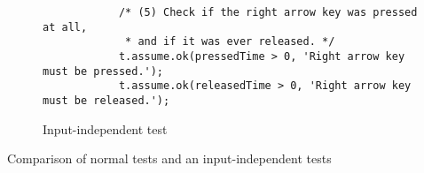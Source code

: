 \begin{listing}[ht]
\begin{subfigure}[b]{.55\textwidth}
\begin{verbatim}
            /* (5) Check if the right arrow key was pressed at all,
             * and if it was ever released. */
            t.assume.ok(pressedTime > 0, 'Right arrow key must be pressed.');
            t.assume.ok(releasedTime > 0, 'Right arrow key must be released.');
        \end{verbatim}
        \caption{Input-independent test}
    \end{subfigure}
    \caption{Comparison of normal tests and an input-independent tests}
    \label{fig:normal-input-independent-test-comparison}
\end{listing}
\parspace

